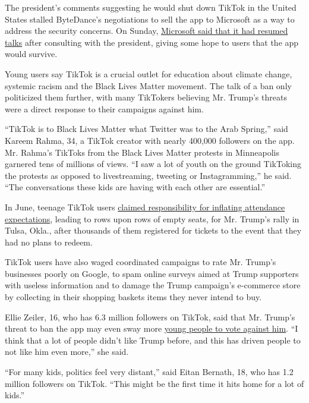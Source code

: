 The president's comments suggesting he would shut down TikTok in the
United States stalled ByteDance's negotiations to sell the app to
Microsoft as a way to address the security concerns. On Sunday,
\href{https://www.nytimes3xbfgragh.onion/2020/08/02/business/economy/trump-tiktok-china-national-security.html}{Microsoft
said that it had resumed talks} after consulting with the president,
giving some hope to users that the app would survive.

Young users say TikTok is a crucial outlet for education about climate
change, systemic racism and the Black Lives Matter movement. The talk of
a ban only politicized them further, with many TikTokers believing Mr.
Trump's threats were a direct response to their campaigns against him.

``TikTok is to Black Lives Matter what Twitter was to the Arab Spring,''
said Kareem Rahma, 34, a TikTok creator with nearly 400,000 followers on
the app. Mr. Rahma's TikToks from the Black Lives Matter protests in
Minneapolis garnered tens of millions of views. ``I saw a lot of youth
on the ground TikToking the protests as opposed to livestreaming,
tweeting or Instagramming,'' he said. ``The conversations these kids are
having with each other are essential.''

In June, teenage TikTok users
\href{https://www.nytimes3xbfgragh.onion/2020/06/21/style/tiktok-trump-rally-tulsa.html}{claimed
responsibility for inflating attendance expectations}, leading to rows
upon rows of empty seats, for Mr. Trump's rally in Tulsa, Okla., after
thousands of them registered for tickets to the event that they had no
plans to redeem.

TikTok users have also waged coordinated campaigns to rate Mr. Trump's
businesses poorly on Google, to spam online surveys aimed at Trump
supporters with useless information and to damage the Trump campaign's
e-commerce store by collecting in their shopping baskets items they
never intend to buy.

Ellie Zeiler, 16, who has 6.3 million followers on TikTok, said that Mr.
Trump's threat to ban the app may even sway more
\href{https://www.nbcnews.com/news/us-news/trump-s-threatened-tiktok-ban-could-motivate-young-users-vote-n1235587}{young
people to vote against him}. ``I think that a lot of people didn't like
Trump before, and this has driven people to not like him even more,''
she said.

``For many kids, politics feel very distant,'' said Eitan Bernath, 18,
who has 1.2 million followers on TikTok. ``This might be the first time
it hits home for a lot of kids.''

